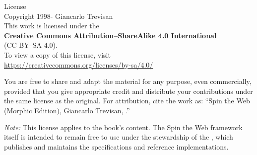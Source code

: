 \cleardoublepage
\thispagestyle{empty}
\begin{center}
{\Large License}\\[1.25em]
Copyright \textcopyright{} 1998-\the\year{} Giancarlo Trevisan\\[0.75em]
This work is licensed under the\\
{\bfseries Creative Commons Attribution--ShareAlike 4.0 International}\\
(CC BY--SA 4.0).\\[0.75em]
To view a copy of this license, visit\\
\url{https://creativecommons.org/licenses/by-sa/4.0/}
\end{center}

\vfill
\noindent You are free to share and adapt the material for any purpose, even commercially, provided that you give appropriate credit and distribute your contributions under the same license as the original. For attribution, cite the work as: “Spin the Web (Morphic Edition), Giancarlo Trevisan, \the\year.”

\medskip

\noindent \textit{Note:} This license applies to the book’s content. The Spin the Web framework itself is intended to remain free to use under the stewardship of the \organization{}, which publishes and maintains the specifications and reference implementations.
